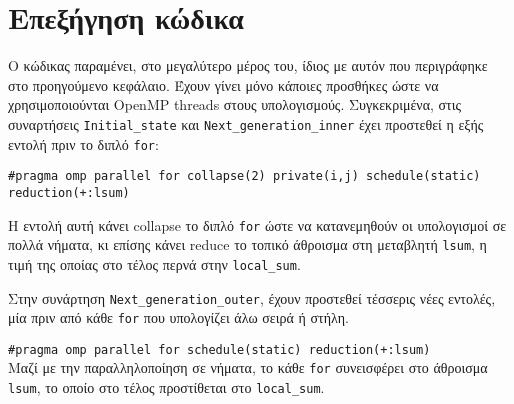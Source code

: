 \section{Επεξήγηση κώδικα}
\begin{multicols}{2}
Ο κώδικας παραμένει, στο μεγαλύτερο μέρος του, ίδιος με αυτόν που περιγράφηκε στο προηγούμενο κεφάλαιο. Έχουν γίνει μόνο κάποιες προσθήκες ώστε να χρησιμοποιούνται OpenMP threads στους υπολογισμούς. Συγκεκριμένα, στις συναρτήσεις \texttt{Initial_state} και \texttt{Next_generation_inner} έχει προστεθεί η εξής εντολή πριν το διπλό \texttt{for}: \\
\end{multicols}

\texttt{#pragma}\texttt{ omp parallel for collapse(2) private(i,j) schedule(static) reduction(+:lsum)} \\

\begin{multicols}{2}
Η εντολή αυτή κάνει collapse  το διπλό \texttt{for} ώστε να κατανεμηθούν οι υπολογισμοί σε πολλά νήματα, κι επίσης κάνει reduce το τοπικό άθροισμα στη μεταβλητή \texttt{lsum}, η τιμή της οποίας στο τέλος περνά στην \texttt{local_sum}. \par

Στην συνάρτηση \texttt{Next_generation_outer}, έχουν προστεθεί τέσσερις νέες εντολές, μία πριν από κάθε \texttt{for} που υπολογίζει άλω σειρά ή στήλη. \\
\end{multicols}

\texttt{#pragma}\texttt{ omp parallel for schedule(static) reduction(+:lsum)} \\

Μαζί με την παραλληλοποίηση σε νήματα, το κάθε \texttt{for} συνεισφέρει στο άθροισμα \texttt{lsum}, το οποίο στο τέλος προστίθεται στο \texttt{local_sum}.